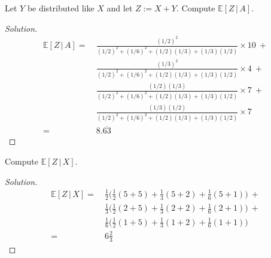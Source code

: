 \documentclass[12pt]{article}
\newenvironment{problem}[2][Problem]{\begin{trivlist}
\item[\hskip \labelsep {\bfseries #1}\hskip \labelsep {\bfseries #2.}]}{\end{trivlist}}
\newenvironment{solution}
  {\begin{proof}[Solution]\renewcommand{\qedsymbol}{}}
  {\end{proof}}
\begin{document}
\begin{problem}{2(c)} 
Let $Y$ be distributed like $X$ and let $Z := X + Y$.  Compute $\mathbb{E}[Z \, | \, A]$.
\end{problem}
\begin{solution}\ \\

\begin{align*}\mathbb{E}[Z \, | \, A] = &~\frac{(1/2)^2}{(1/2)^2 + (1/6)^2 + (1/2)(1/3)+(1/3)(1/2)}\times 10 ~+\\
                           &~\frac{(1/3)^2}{(1/2)^2 + (1/6)^2 + (1/2)(1/3)+(1/3)(1/2)}\times 4 ~ + \\
                           &~\frac{(1/2)(1/3)}{(1/2)^2 + (1/6)^2 + (1/2)(1/3)+(1/3)(1/2)}\times 7 ~+\\
                           &~\frac{(1/3)(1/2)}{(1/2)^2 + (1/6)^2 + (1/2)(1/3)+(1/3)(1/2)}\times 7  \\
                           = &~ 8. \overline{63}
\end{align*}
\end{solution}

\begin{problem}{2(c)} 
Compute $\mathbb{E}[Z \, | \, X]$.
\end{problem}
\begin{solution}\ \\

\begin{align*}\mathbb{E}[Z \, | \, X] = &~\frac{1}{2}\bigg(\frac{1}{2}(5+5)+\frac{1}{3}(5+2)+\frac{1}{6}(5+1)\bigg) ~+\\
                                        &~\frac{1}{3}\bigg(\frac{1}{2}(2+5)+\frac{1}{3}(2+2)+\frac{1}{6}(2+1)\bigg) ~+\\
                                        &~\frac{1}{6}\bigg(\frac{1}{2}(1+5)+\frac{1}{3}(1+2)+\frac{1}{6}(1+1)\bigg) \\
                                        =&~ 6 \frac{2}{3}
\end{align*}
\end{solution}
\end{document}
